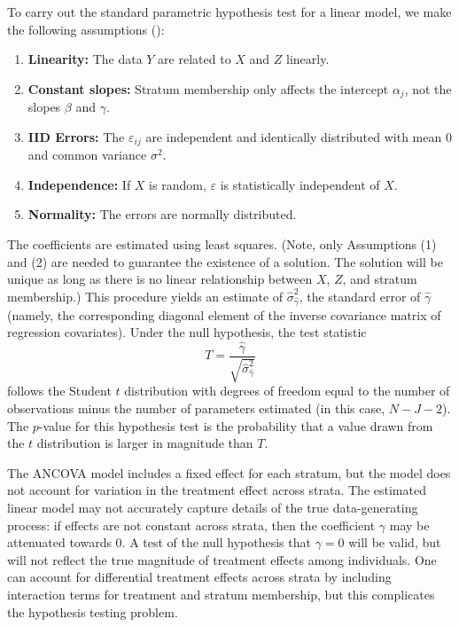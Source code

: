 \documentclass[12pt]{article}
\begin{document}
To carry out the standard parametric hypothesis test for a linear model, we make the following assumptions (\cite{freedman_statistical_2005}):

\begin{enumerate}
\item \textbf{Linearity:} The data $Y$ are related to $X$ and $Z$ linearly.
\item \textbf{Constant slopes:} Stratum membership only affects the intercept $\alpha_j$, not the slopes $\beta$ and $\gamma$.
\item \textbf{IID Errors:} The $\varepsilon_{ij}$ are independent and identically distributed with mean $0$ and common variance $\sigma^2$.
\item \textbf{Independence:} If $X$ is random, $\varepsilon$ is statistically independent of $X$.
\item \textbf{Normality:} The errors are normally distributed.
\end{enumerate}

The coefficients are estimated using least squares.
(Note, only Assumptions (1) and (2) are needed to guarantee the existence of a solution.
The solution will be unique as long as there is no linear relationship between $X$, $Z$, and stratum membership.)
This procedure yields an estimate of $\hat{\sigma}_{\hat{\gamma}}^2$, the  standard error of $\hat{\gamma}$
(namely, the corresponding diagonal element of the inverse covariance matrix of regression covariates).
Under the null hypothesis, the test statistic 
$$ T = \frac{\hat{\gamma}}{\sqrt{ \hat{\sigma}_{\hat{\gamma}}^2}}$$
follows the Student $t$ distribution with degrees of freedom equal to the number of observations minus the number of parameters estimated (in this case, $N - J - 2$).
The $p$-value for this hypothesis test is the probability that a value drawn from the $t$ distribution is larger in magnitude than $T$.


The ANCOVA model includes a fixed effect for each stratum, but 
the model does not account for variation in the treatment effect across strata.  
The estimated linear model may not accurately capture details of the true data-generating process:
if effects are not constant across strata, then the coefficient $\gamma$ may be attenuated towards 0.
A test of the null hypothesis that $\gamma = 0$ will be valid, but will not reflect the true magnitude of treatment effects among individuals.
One can account for differential treatment effects across strata by including interaction terms for treatment and stratum membership, but this complicates the hypothesis testing problem. 
\end{document}
